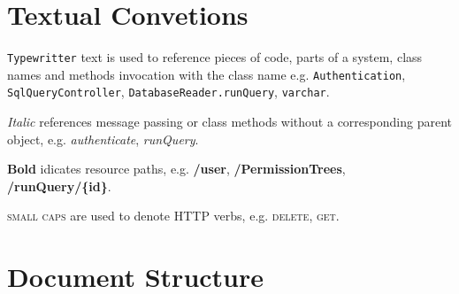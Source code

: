 \section{Textual Convetions}

\texttt{Typewritter} text is used to reference pieces of code, parts of a system, class names and methods invocation with the class name e.g. \texttt{Authentication}, \texttt{SqlQueryController}, \texttt{DatabaseReader.runQuery}, \texttt{varchar}.

\textit{Italic}  references message passing or class methods without a corresponding parent object, e.g. \textit{authenticate}, \textit{runQuery}.

\textbf{Bold} idicates resource paths, e.g. \textbf{/user}, \textbf{/PermissionTrees}, \textbf{/runQuery/\{id\}}.

\textsc{small caps} are used to denote HTTP verbs, e.g. \textsc{delete}, \textsc{get}.

\section{Document Structure}



